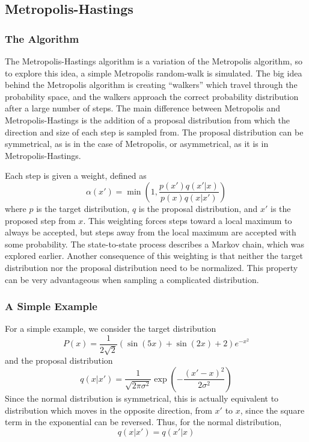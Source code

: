 \subsection{Metropolis-Hastings}
\subsubsection{The Algorithm}
The Metropolis-Hastings algorithm is a variation of the Metropolis algorithm, so
to explore this idea, a simple Metropolis random-walk is simulated. The big idea
behind the Metropolis algorithm is creating ``walkers'' which travel through the
probability space, and the walkers approach the correct probability distribution
after a large number of steps. The main difference between Metropolis and
Metropolis-Hastings is the addition of a proposal distribution from which the
direction and size of each step is sampled from. The proposal distribution can
be symmetrical, as is in the case of Metropolis, or asymmetrical, as it is in
Metropolis-Hastings.

Each step is given a weight, defined as
\begin{equation}
  \alpha(x') = \min \left( 1, \frac{p(x') q(x' | x)}{p(x) q(x | x')} \right)
  \label{eq:acceptance}
\end{equation}
where $p$ is the target distribution, $q$ is the proposal distribution, and $x'$
is the proposed step from $x$. This weighting forces steps toward a local
maximum to always be accepted, but steps away from the local maximum are
accepted with some probability. The state-to-state process describes a Markov
chain, which was explored earlier. Another consequence of this weighting is that
neither the target distribution nor the proposal distribution need to be
normalized. This property can be very advantageous when sampling a complicated
distribution.

\subsubsection{A Simple Example}
For a simple example, we consider the target distribution
\begin{equation}
  P(x) = \frac{1}{2 \sqrt{2}} \left( \sin(5x) + \sin(2x) + 2 \right) e^{-x^2}
  \label{eq:example}
\end{equation}
and the proposal distribution
\begin{equation}
  q(x | x') = \frac{1}{\sqrt{2 \pi \sigma^2}} \exp \left( - \frac{(x' - x)^2}{2 \sigma^2} \right)
\end{equation}
Since the normal distribution is symmetrical, this is actually equivalent to
distribution which moves in the opposite direction, from $x'$ to $x$, since the
square term in the exponential can be reversed. Thus, for the normal
distribution,
\begin{equation}
  q(x | x') = q(x' | x)
\end{equation}

